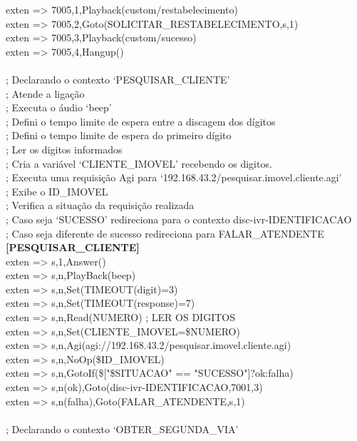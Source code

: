 \begin{anexosenv}
exten => 7005,1,Playback(custom/restabelecimento) \\
exten => 7005,2,Goto(SOLICITAR\_RESTABELECIMENTO,s,1) \\
exten => 7005,3,Playback(custom/sucesso) \\
exten => 7005,4,Hangup() \\
 \\
; Declarando o contexto ‘PESQUISAR\_CLIENTE’ \\
; Atende a ligação \\
; Executa o áudio ‘beep’ \\
; Defini o tempo limite de espera entre a discagem dos dígitos \\
; Defini o tempo limite de espera do primeiro dígito \\
; Ler os digitos informados \\
; Cria a variável ‘CLIENTE\_IMOVEL’ recebendo os digitos. \\
; Executa uma requisição Agi para ‘192.168.43.2/pesquisar.imovel.cliente.agi’ \\
; Exibe o ID\_IMOVEL \\
; Verifica a situação da requisição realizada \\
; Caso seja ‘SUCESSO’ redireciona para o contexto disc-ivr-IDENTIFICACAO \\
; Caso seja diferente de sucesso redireciona para FALAR\_ATENDENTE \\
\textbf{[PESQUISAR\_CLIENTE]} \\
exten => s,1,Answer() \\
exten => s,n,PlayBack(beep) \\
exten => s,n,Set(TIMEOUT(digit)=3)  \\
exten => s,n,Set(TIMEOUT(response)=7)  \\
exten => s,n,Read(NUMERO) ; LER OS DIGITOS \\
exten => s,n,Set(CLIENTE\_IMOVEL=\${NUMERO}) \\
exten => s,n,Agi(agi://192.168.43.2/pesquisar.imovel.cliente.agi) \\
exten => s,n,NoOp(\${ID\_IMOVEL}) \\
exten => s,n,GotoIf(\$["\${SITUACAO}" == "SUCESSO"]?ok:falha) \\
exten => s,n(ok),Goto(disc-ivr-IDENTIFICACAO,7001,3) \\
exten => s,n(falha),Goto(FALAR\_ATENDENTE,s,1) \\
 \\
; Declarando o contexto ‘OBTER\_SEGUNDA\_VIA’ \\

\end{anexosenv}
